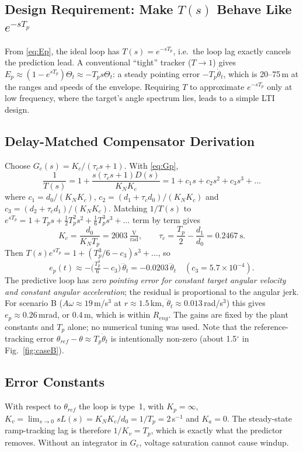 \documentclass[conference]{IEEEtran}
\newcommand{\Tp}{T_p}
\begin{document}
\subsection{Design Requirement: Make $T(s)$ Behave Like $e^{-s\Tp}$}
From \eqref{eq:Ep}, the ideal loop has $T(s)=e^{-s\Tp}$, i.e.\ the loop lag
exactly cancels the prediction lead. A conventional ``tight'' tracker
($T\to1$) gives $E_p\approx(1-e^{s\Tp})\Theta_t\approx-\Tp s\Theta_t$: a
steady pointing error $-\Tp\dot\theta_t$, which is 20--75\,m at the ranges and
speeds of the envelope. Requiring $T$ to approximate $e^{-s\Tp}$ only at low
frequency, where the target's angle spectrum lies, leads to a simple LTI design.

\subsection{Delay-Matched Compensator Derivation}
Choose $G_c(s)=K_c/(\tau_cs+1)$. With \eqref{eq:Gp},
\begin{equation}
\frac{1}{T(s)}=1+\frac{s(\tau_cs+1)D(s)}{K_NK_c}
=1+c_1s+c_2s^2+c_3s^3+\dots
\end{equation}
where $c_1=d_0/(K_NK_c)$, $c_2=(d_1+\tau_cd_0)/(K_NK_c)$ and
$c_3=(d_2+\tau_cd_1)/(K_NK_c)$. Matching $1/T(s)$ to
$e^{s\Tp}=1+\Tp s+\tfrac12\Tp^2s^2+\tfrac16\Tp^3s^3+\dots$ term by term gives
\begin{equation}
\boxed{K_c=\frac{d_0}{K_N\Tp}=2003\ \tfrac{\mathrm{V}}{\mathrm{rad}},\qquad
\tau_c=\frac{\Tp}{2}-\frac{d_1}{d_0}=0.2467\ \mathrm{s}.}
\end{equation}
Then $T(s)e^{s\Tp}=1+(\Tp^3/6-c_3)s^3+\dots$, so
\begin{equation}
e_p(t)\approx-\Big(\tfrac{\Tp^3}{6}-c_3\Big)\,\dddot\theta_t
=-0.0203\,\dddot\theta_t\quad(c_3=5.7\times10^{-4}).
\label{eq:resid}
\end{equation}
The predictive loop has \emph{zero pointing error for constant target angular
velocity and constant angular acceleration}; the residual is proportional to the
angular jerk. For scenario B ($A\omega\approx19$\,m/s$^3$ at $r\approx1.5$\,km,
$\dddot\theta_t\approx0.013$\,rad/s$^3$) this gives $e_p\approx0.26$\,mrad, or
0.4\,m, which is within $R_{eng}$. The gains are fixed by the plant constants
and $\Tp$ alone; no numerical tuning was used. Note that the reference-tracking
error $\theta_{ref}-\theta\approx\Tp\dot\theta_t$ is intentionally non-zero
(about 1.5$^\circ$ in Fig.~\ref{fig:caseB}).

\subsection{Error Constants}
With respect to $\theta_{ref}$ the loop is type~1, with $K_p=\infty$,
$K_v=\lim_{s\to0}sL(s)=K_NK_c/d_0=1/\Tp=2$\,s$^{-1}$ and $K_a=0$. The
steady-state ramp-tracking lag is therefore $1/K_v=\Tp$, which is exactly what
the predictor removes. Without an integrator in $G_c$, voltage saturation
cannot cause windup.
\end{document}
